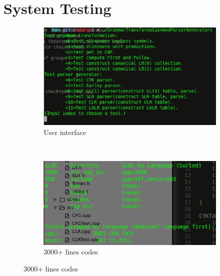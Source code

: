 \documentclass{beamer}
\begin{document}
\section{System Testing}
 \begin{frame}
\begin{figure}
    \centering
    \begin{subfigure}[b]{0.5\textwidth}
        \includegraphics[width=\textwidth]{ui.png}
        \caption{User interface}
        \label{fig:ui}
    \end{subfigure}
    ~ %
    \begin{subfigure}[b]{0.5\textwidth}
        \includegraphics[width=\textwidth]{codes.png}
        \caption{3000+ lines codes}
        \label{fig:codes}
    \end{subfigure}
\end{figure}
 \end{frame}
\end{document}
